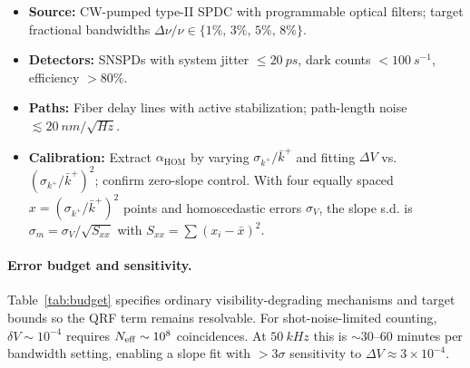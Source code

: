 \documentclass[aps,11pt]{article}
\newcommand{\kplus}{k^{+}}
\newcommand{\kbar}{\bar{k}^{+}}
\newcommand{\alphahom}{\alpha_{\text{HOM}}}
\begin{document}
\begin{itemize}[leftmargin=1.2em]
\item \textbf{Source:} CW-pumped type-II SPDC with programmable optical filters; target fractional bandwidths \(\Delta\nu/\nu\in\{1\%,\,3\%,\,5\%,\,8\%\}\).
\item \textbf{Detectors:} SNSPDs with system jitter \(\le 20~\si{ps}\), dark counts \(<100~\si{s^{-1}}\), efficiency \(>80\%\).
\item \textbf{Paths:} Fiber delay lines with active stabilization; path-length noise \(\lesssim 20~\si{nm}/\sqrt{\si{Hz}}\).
\item \textbf{Calibration:} Extract \(\alphahom\) by varying \(\sigma_{\kplus}/\kbar\) and fitting \(\Delta V\) vs. \((\sigma_{\kplus}/\kbar)^2\); confirm zero-slope control. With four equally spaced \(x=(\sigma_{k^+}/\bar k^+)^2\) points and homoscedastic errors \(\sigma_V\), the slope s.d. is \(\sigma_m=\sigma_V/\sqrt{S_{xx}}\) with \(S_{xx}=\sum (x_i-\bar x)^2\).
\end{itemize}

\paragraph{Error budget and sensitivity.}
Table~\ref{tab:budget} specifies ordinary visibility-degrading mechanisms and target bounds so the QRF term remains resolvable. For shot-noise-limited counting, \(\delta V \sim 10^{-4}\) requires \(N_{\rm eff}\sim 10^{8}\) coincidences. At \(50~\si{kHz}\) this is \(\sim 30\)–\(60\) minutes per bandwidth setting, enabling a slope fit with \(>3\sigma\) sensitivity to \(\Delta V\approx 3\times 10^{-4}\).
\end{document}
